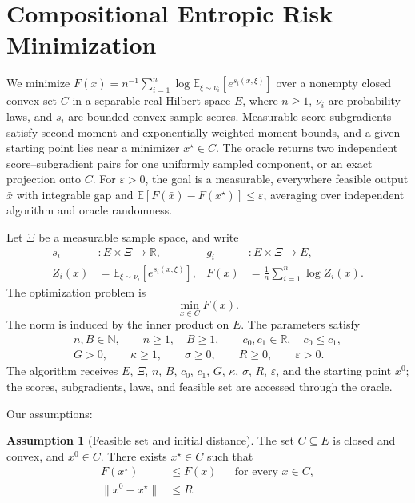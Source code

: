 \documentclass[10pt]{article}
\theoremstyle{definition}
\newtheorem{assumption}{Assumption}
\begin{document}
\section*{Compositional Entropic Risk Minimization}
We minimize $F(x)=n^{-1}\sum_{i=1}^n\log\mathbb{E}_{\xi\sim\nu_i}[e^{s_i(x,\xi)}]$ over a nonempty closed convex set $C$ in a separable real Hilbert space $E$, where $n\geq1$, $\nu_i$ are probability laws, and $s_i$ are bounded convex sample scores. Measurable score subgradients satisfy second-moment and exponentially weighted moment bounds, and a given starting point lies near a minimizer $x^\star\in C$. The oracle returns two independent score--subgradient pairs for one uniformly sampled component, or an exact projection onto $C$. For $\varepsilon>0$, the goal is a measurable, everywhere feasible output $\bar{x}$ with integrable gap and $\mathbb{E}[F(\bar{x})-F(x^\star)]\leq\varepsilon$, averaging over independent algorithm and oracle randomness.

Let $\Xi$ be a measurable sample space, and write
\[
\begin{aligned}
s_i &: E\times\Xi\to\mathbb{R}, &
g_i &: E\times\Xi\to E,\\
Z_i(x)&=\mathbb{E}_{\xi\sim\nu_i}[e^{s_i(x,\xi)}], &
F(x)&=\frac{1}{n}\sum_{i=1}^n\log Z_i(x).
\end{aligned}
\]
The optimization problem is
\[
\min_{x\in C} F(x).
\]
The norm is induced by the inner product on $E$. The parameters satisfy
\[
\begin{gathered}
n,B\in\mathbb{N},\qquad n\geq1,\quad B\geq1,\qquad
c_0,c_1\in\mathbb{R},\quad c_0\leq c_1,\\
G>0,\qquad \kappa\geq1,\qquad \sigma\geq0,\qquad
R\geq0,\qquad \varepsilon>0.
\end{gathered}
\]
The algorithm receives $E$, $\Xi$, $n$, $B$, $c_0$, $c_1$, $G$, $\kappa$, $\sigma$, $R$, $\varepsilon$, and the starting point $x^0$; the scores, subgradients, laws, and feasible set are accessed through the oracle.

Our assumptions:
\begin{assumption}[Feasible set and initial distance]
The set $C\subseteq E$ is closed and convex, and $x^0\in C$. There exists $x^\star\in C$ such that
\[
\begin{aligned}
F(x^\star)&\leq F(x) &&\text{for every }x\in C,\\
\|x^0-x^\star\|&\leq R.
\end{aligned}
\]
\end{assumption}
\end{document}
